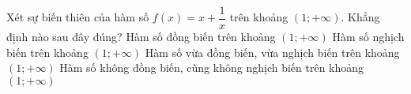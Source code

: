 \begin{ex}%
    Xét sự biến thiên của hàm số $f(x)=x+\dfrac{1}{x}$ trên khoảng $\left(1;+\infty \right)$. Khẳng định nào sau đây đúng?
    \choice
    {\True Hàm số đồng biến trên khoảng $\left(1;+\infty \right)$}
    {Hàm số nghịch biến trên khoảng $\left(1;+\infty \right)$}
    {Hàm số vừa đồng biến, vừa nghịch biến trên khoảng $\left(1;+\infty \right)$}
    {Hàm số không đồng biến, cũng không nghịch biến trên khoảng $\left(1;+\infty \right)$}
\end{ex}

